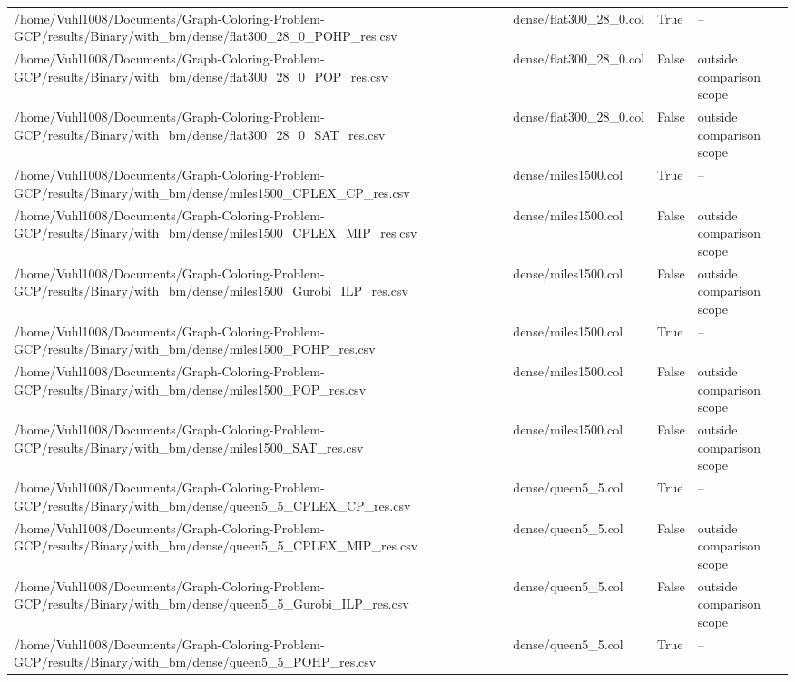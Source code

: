 \begin{table}[htbp]
\begin{tabular}{llll}
/home/Vuhl1008/Documents/Graph-Coloring-Problem-GCP/results/Binary/with\_bm/dense/flat300\_28\_0\_POHP\_res.csv & dense/flat300\_28\_0.col & True & -- \\
/home/Vuhl1008/Documents/Graph-Coloring-Problem-GCP/results/Binary/with\_bm/dense/flat300\_28\_0\_POP\_res.csv & dense/flat300\_28\_0.col & False & outside comparison scope \\
/home/Vuhl1008/Documents/Graph-Coloring-Problem-GCP/results/Binary/with\_bm/dense/flat300\_28\_0\_SAT\_res.csv & dense/flat300\_28\_0.col & False & outside comparison scope \\
/home/Vuhl1008/Documents/Graph-Coloring-Problem-GCP/results/Binary/with\_bm/dense/miles1500\_CPLEX\_CP\_res.csv & dense/miles1500.col & True & -- \\
/home/Vuhl1008/Documents/Graph-Coloring-Problem-GCP/results/Binary/with\_bm/dense/miles1500\_CPLEX\_MIP\_res.csv & dense/miles1500.col & False & outside comparison scope \\
/home/Vuhl1008/Documents/Graph-Coloring-Problem-GCP/results/Binary/with\_bm/dense/miles1500\_Gurobi\_ILP\_res.csv & dense/miles1500.col & False & outside comparison scope \\
/home/Vuhl1008/Documents/Graph-Coloring-Problem-GCP/results/Binary/with\_bm/dense/miles1500\_POHP\_res.csv & dense/miles1500.col & True & -- \\
/home/Vuhl1008/Documents/Graph-Coloring-Problem-GCP/results/Binary/with\_bm/dense/miles1500\_POP\_res.csv & dense/miles1500.col & False & outside comparison scope \\
/home/Vuhl1008/Documents/Graph-Coloring-Problem-GCP/results/Binary/with\_bm/dense/miles1500\_SAT\_res.csv & dense/miles1500.col & False & outside comparison scope \\
/home/Vuhl1008/Documents/Graph-Coloring-Problem-GCP/results/Binary/with\_bm/dense/queen5\_5\_CPLEX\_CP\_res.csv & dense/queen5\_5.col & True & -- \\
/home/Vuhl1008/Documents/Graph-Coloring-Problem-GCP/results/Binary/with\_bm/dense/queen5\_5\_CPLEX\_MIP\_res.csv & dense/queen5\_5.col & False & outside comparison scope \\
/home/Vuhl1008/Documents/Graph-Coloring-Problem-GCP/results/Binary/with\_bm/dense/queen5\_5\_Gurobi\_ILP\_res.csv & dense/queen5\_5.col & False & outside comparison scope \\
/home/Vuhl1008/Documents/Graph-Coloring-Problem-GCP/results/Binary/with\_bm/dense/queen5\_5\_POHP\_res.csv & dense/queen5\_5.col & True & -- \\

\end{tabular}
\end{table}
